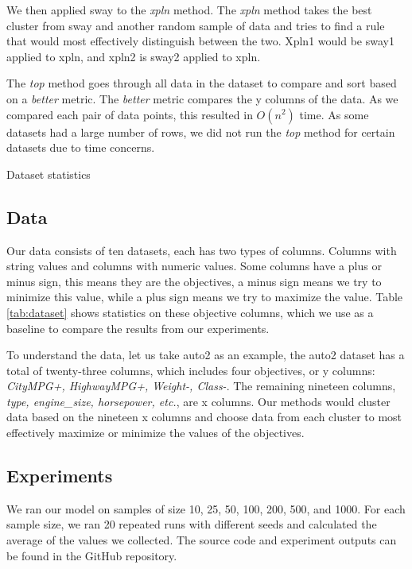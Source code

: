 We then applied sway to the \textit{xpln} method. The \textit{xpln}
method takes the best cluster from sway and another random sample of
data and tries to find a rule that would most effectively distinguish
between the two. Xpln1 would be sway1 applied to xpln, and xpln2 is
sway2 applied to xpln.  

The \textit{top} method goes through all data in the dataset to compare
and sort based on a \textit{better} metric. The \textit{better} metric
compares the y columns of the data. As we compared each pair of data
points, this resulted in $O(n^2)$ time. As some datasets had a large number
of rows, we did not run the \textit{top} method for certain datasets due
to time concerns. 


\begin{table*}[h]
  \begin{center}
    
  \end{center}
  \caption{Dataset statistics}
  \label{tab:dataset}
\end{table*}

\subsection{Data}
  Our data consists of ten datasets, each has two types of columns.
  Columns with string values and columns with numeric values. Some
  columns have a plus or minus sign, this means they are the objectives,
  a minus sign means we try to minimize this value, while a plus sign
  means we try to maximize the value. Table \ref{tab:dataset} shows
  statistics on these objective columns, which we use as a baseline to
  compare the results from our experiments.

  To understand the data, let us take auto2 as an example, the auto2
  dataset has a total of twenty-three columns,
  which includes four objectives, or y columns: \textit{CityMPG+,
  HighwayMPG+, Weight-, Class-}. The remaining nineteen columns,
  \textit{type, engine\_size, horsepower, etc.}, are x columns. 
  Our methods would cluster data based on the nineteen x columns and
  choose data from each cluster to most effectively
  maximize or minimize the values of the objectives.


\subsection{Experiments}
  We ran our model on samples of size 10, 25, 50, 100, 200, 500, and
  1000. For each sample size, we ran 20 repeated runs with different
  seeds and calculated the average of the values we collected. The
  source code and experiment outputs can be found in the GitHub
  repository. 



  